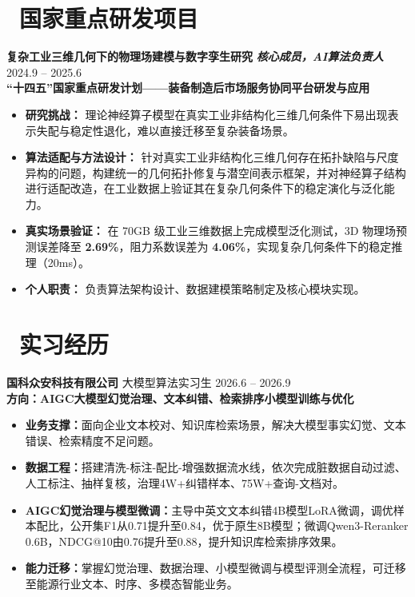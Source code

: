 \documentclass[11pt]{article}
\begin{document}
\section{\makebox[\widthof{\faBriefcase}][c]{\color{CVBlue}%
\faBriefcase}\ 国家重点研发项目}
\textbf{复杂工业三维几何下的物理场建模与数字孪生研究}
\textit{\textbf{核心成员，AI算法负责人}}
\hfill 2024.9 -- 2025.6\\[0.2em]
\textcolor{CVBlue}{\textbf{“十四五”国家重点研发计划——装备制造后市场服务协同平台研发与应用}}
\begin{itemize}
    \item \textbf{研究挑战：} 理论神经算子模型在真实工业非结构化三维几何条件下易出现表示失配与稳定性退化，难以直接迁移至复杂装备场景。
    \item \textbf{算法适配与方法设计：} 针对真实工业非结构化三维几何存在拓扑缺陷与尺度异构的问题，构建统一的几何拓扑修复与潜空间表示框架，并对神经算子结构进行适配改造，在工业数据上验证其在复杂几何条件下的稳定演化与泛化能力。
    \item \textbf{真实场景验证：} 在 70GB 级工业三维数据上完成模型泛化测试，3D 物理场预测误差降至 \textbf{2.69\%}，阻力系数误差为 \textbf{4.06\%}，实现复杂几何条件下的稳定推理（20ms）。
    \item \textbf{个人职责：} 负责算法架构设计、数据建模策略制定及核心模块实现。
\end{itemize}

\section{\makebox[\widthof{\faBuilding}][c]{\color{CVBlue}\faBuilding}\ 实习经历}
\textbf{国科众安科技有限公司} \quad 大模型算法实习生 \hfill 2026.6 -- 2026.9\\[0.2em]
\textcolor{CVBlue}{\textbf{方向：AIGC大模型幻觉治理、文本纠错、检索排序小模型训练与优化}}
\begin{itemize}
    \item \textbf{业务支撑：}面向企业文本校对、知识库检索场景，解决大模型事实幻觉、文本错误、检索精度不足问题。
    \item \textbf{数据工程：}搭建清洗-标注-配比-增强数据流水线，依次完成脏数据自动过滤、人工标注、抽样复核，治理4W+纠错样本、75W+查询-文档对。
    \item \textbf{AIGC幻觉治理与模型微调：}主导中英文文本纠错4B模型LoRA微调，调优样本配比，公开集F1从0.71提升至0.84，优于原生8B模型；微调Qwen3-Reranker 0.6B，NDCG@10由0.76提升至0.88，提升知识库检索排序效果。
    \item \textbf{能力迁移：}掌握幻觉治理、数据治理、小模型微调与模型评测全流程，可迁移至能源行业文本、时序、多模态智能业务。
\end{itemize}
\end{document}
